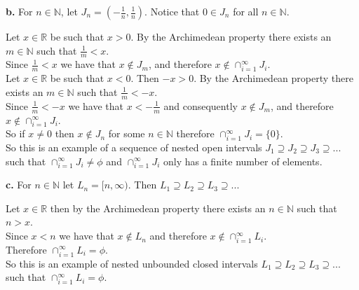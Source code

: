 \documentclass{article}
\begin{document}
{\Large \textbf{b.}} For $n\in\mathbb{N}$, let $J_n = (-\frac{1}{n}, \frac{1}{n})$. Notice that $0\in J_n$ for all $n\in\mathbb{N}$.
\begin{center}
    \doublespacing
    Let $x\in\mathbb{R}$ be such that $x > 0$. By the Archimedean property there exists an $m\in\mathbb{N}$ such that $\frac{1}{m} < x$.
    \\Since $\frac{1}{m} < x$ we have that $x\notin J_{m}$, and therefore $x\notin\cap _{i=1}^{\infty} J_i$.
    \\Let $x\in\mathbb{R}$ be such that $x < 0$. Then $-x > 0$. By the Archimedean property there exists an $m\in\mathbb{N}$ such that $\frac{1}{m} < -x$.
    \\Since $\frac{1}{m} < -x$ we have that $x < -\frac{1}{m}$ and consequently $x\notin J_{m}$, and therefore $x\notin\cap _{i=1}^{\infty} J_i$.
    \\So if $x\neq 0$ then $x\notin J_n$ for some $n\in\mathbb{N}$ therefore $\cap _{i=1}^{\infty} J_i = \{0\}$.
    \\So this is an example of a sequence of nested open intervals $J_1\supseteq J_2\supseteq J_3\supseteq ...$ such that $\cap _{i=1}^{\infty} J_i\neq\phi$ and $\cap _{i=1}^{\infty} J_i$ only has a finite number of elements.
\end{center}

\newpage
{\Large \textbf{c.}} For $n\in\mathbb{N}$ let $L_n = [n, \infty)$. Then $L_1\supseteq L_2\supseteq L_3\supseteq ...$
\begin{center}
    \doublespacing
    Let $x\in\mathbb{R}$ then by the Archimedean property there exists an $n\in\mathbb{N}$ such that $n > x$.
    \\Since $x < n$ we have that $x\notin L_n$ and therefore $x\notin\cap _{i=1}^\infty L_i$.
    \\Therefore $\cap _{i=1}^\infty L_i =\phi$.
    \\So this is an example of nested unbounded closed intervals $L_1\supseteq L_2\supseteq L_3\supseteq ...$ such that $\cap _{i=1}^\infty L_i =\phi$.
\end{center}
\end{document}
